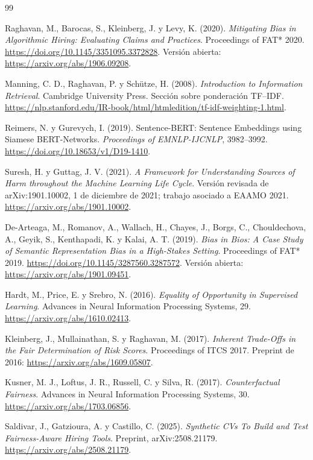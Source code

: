 \begin{thebibliography}{99}
\small
\setlength{\itemsep}{0.45em}

 Raghavan, M., Barocas, S., Kleinberg, J. y Levy, K. (2020). \textit{Mitigating Bias in Algorithmic Hiring: Evaluating Claims and Practices}. Proceedings of FAT* 2020. \url{https://doi.org/10.1145/3351095.3372828}. Versión abierta: \url{https://arxiv.org/abs/1906.09208}.

 Manning, C. D., Raghavan, P. y Schütze, H. (2008). \textit{Introduction to Information Retrieval}. Cambridge University Press. Sección sobre ponderación TF--IDF. \url{https://nlp.stanford.edu/IR-book/html/htmledition/tf-idf-weighting-1.html}.

 Reimers, N. y Gurevych, I. (2019). Sentence-BERT: Sentence Embeddings using Siamese BERT-Networks. \textit{Proceedings of EMNLP-IJCNLP}, 3982--3992. \url{https://doi.org/10.18653/v1/D19-1410}.

 Suresh, H. y Guttag, J. V. (2021). \textit{A Framework for Understanding Sources of Harm throughout the Machine Learning Life Cycle}. Versión revisada de arXiv:1901.10002, 1 de diciembre de 2021; trabajo asociado a EAAMO 2021. \url{https://arxiv.org/abs/1901.10002}.

 De-Arteaga, M., Romanov, A., Wallach, H., Chayes, J., Borgs, C., Chouldechova, A., Geyik, S., Kenthapadi, K. y Kalai, A. T. (2019). \textit{Bias in Bios: A Case Study of Semantic Representation Bias in a High-Stakes Setting}. Proceedings of FAT* 2019. \url{https://doi.org/10.1145/3287560.3287572}. Versión abierta: \url{https://arxiv.org/abs/1901.09451}.

 Hardt, M., Price, E. y Srebro, N. (2016). \textit{Equality of Opportunity in Supervised Learning}. Advances in Neural Information Processing Systems, 29. \url{https://arxiv.org/abs/1610.02413}.

 Kleinberg, J., Mullainathan, S. y Raghavan, M. (2017). \textit{Inherent Trade-Offs in the Fair Determination of Risk Scores}. Proceedings of ITCS 2017. Preprint de 2016: \url{https://arxiv.org/abs/1609.05807}.

 Kusner, M. J., Loftus, J. R., Russell, C. y Silva, R. (2017). \textit{Counterfactual Fairness}. Advances in Neural Information Processing Systems, 30. \url{https://arxiv.org/abs/1703.06856}.

 Saldivar, J., Gatzioura, A. y Castillo, C. (2025). \textit{Synthetic CVs To Build and Test Fairness-Aware Hiring Tools}. Preprint, arXiv:2508.21179. \url{https://arxiv.org/abs/2508.21179}.


\end{thebibliography}
